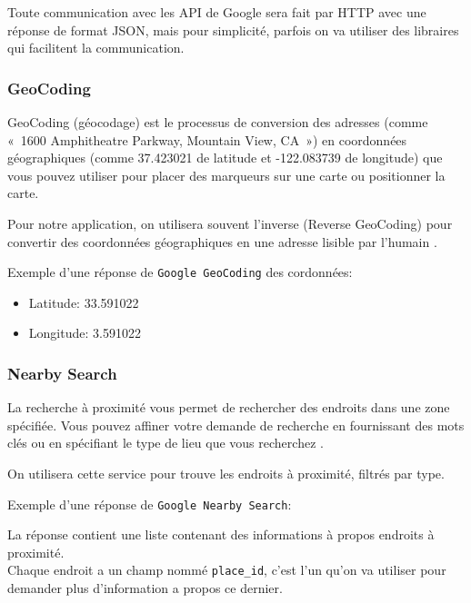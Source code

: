 Toute communication avec les \acrshort{API} de Google sera fait par \acrshort{HTTP} avec une réponse de format \acrshort{JSON}, mais pour simplicité, parfois on va utiliser des libraires qui facilitent la communication.


\subsubsection{GeoCoding}
GeoCoding (géocodage) est le processus de conversion des adresses (comme « 1600 Amphitheatre Parkway, Mountain View, CA ») en coordonnées géographiques (comme 37.423021 de latitude et -122.083739 de longitude) que vous pouvez utiliser pour placer des marqueurs sur une carte ou positionner la carte.

Pour notre application, on utilisera souvent l'inverse (Reverse GeoCoding) pour convertir des coordonnées géographiques en une adresse lisible par l’humain \cite{google-geocoding-overview}.

Exemple d'une réponse de \verb|Google GeoCoding| des cordonnées:
\begin{itemize}
    \item Latitude: 33.591022
    \item Longitude: 3.591022
\end{itemize}



\subsubsection{Nearby Search}

La recherche à proximité vous permet de rechercher des endroits dans une zone spécifiée. Vous pouvez affiner votre demande de recherche en fournissant des mots clés ou en spécifiant le type de lieu que vous recherchez \cite{google-nearby-search}.

On utilisera cette service pour trouve les endroits à proximité, filtrés par type.

Exemple d'une réponse de \verb|Google Nearby Search|:


La réponse contient une liste contenant des informations à propos endroits à proximité. \\
Chaque endroit a un champ nommé \verb|place_id|,  c'est l'un qu'on va utiliser pour demander plus d'information a propos ce dernier.

